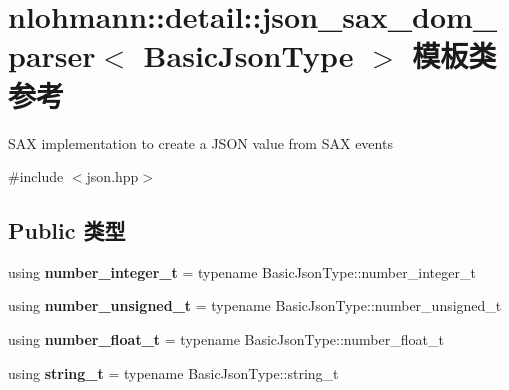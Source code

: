 \hypertarget{classnlohmann_1_1detail_1_1json__sax__dom__parser}{}\section{nlohmann\+::detail\+::json\+\_\+sax\+\_\+dom\+\_\+parser$<$ Basic\+Json\+Type $>$ 模板类 参考}
\label{classnlohmann_1_1detail_1_1json__sax__dom__parser}


S\+AX implementation to create a J\+S\+ON value from S\+AX events  




{\ttfamily \#include $<$json.\+hpp$>$}

\subsection*{Public 类型}
\begin{DoxyCompactItemize}
\item 
\mbox{\label{classnlohmann_1_1detail_1_1json__sax__dom__parser_a3d5cd67d179aa7422ce90e54984a441e}} 
using {\bfseries number\+\_\+integer\+\_\+t} = typename Basic\+Json\+Type\+::number\+\_\+integer\+\_\+t
\item 
\mbox{\label{classnlohmann_1_1detail_1_1json__sax__dom__parser_a90f19b272530a479db81db11be2ea15c}} 
using {\bfseries number\+\_\+unsigned\+\_\+t} = typename Basic\+Json\+Type\+::number\+\_\+unsigned\+\_\+t
\item 
\mbox{\label{classnlohmann_1_1detail_1_1json__sax__dom__parser_ad8da3aad0147b18b3cb76868480300fe}} 
using {\bfseries number\+\_\+float\+\_\+t} = typename Basic\+Json\+Type\+::number\+\_\+float\+\_\+t
\item 
\mbox{\label{classnlohmann_1_1detail_1_1json__sax__dom__parser_afd4d961ab2a6b01cbe6e840f7fb90cdc}} 
using {\bfseries string\+\_\+t} = typename Basic\+Json\+Type\+::string\+\_\+t
\end{DoxyCompactItemize}
